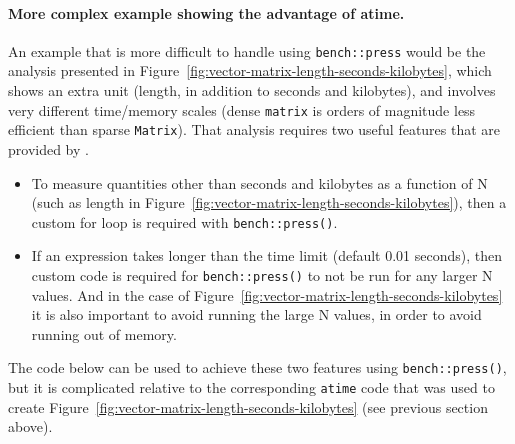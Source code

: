 \paragraph{More complex example showing the advantage of atime.}
An example that is more difficult to handle using \verb|bench::press| would be the analysis presented in Figure~\ref{fig:vector-matrix-length-seconds-kilobytes}, which shows an extra unit (length, in addition to seconds and kilobytes), and involves very different time/memory scales (dense \texttt{matrix} is orders of magnitude less efficient than sparse \texttt{Matrix}).
That analysis requires two useful features that are provided by . 
\begin{itemize}
\item To measure quantities other than seconds and kilobytes as a function of N (such as length in Figure~\ref{fig:vector-matrix-length-seconds-kilobytes}), then a custom for loop is required with \verb|bench::press()|.
\item If an expression takes longer than the time limit (default 0.01 seconds), then custom code is required for \verb|bench::press()| to not be run for any larger N values. 
And in the case of Figure~\ref{fig:vector-matrix-length-seconds-kilobytes} it is also important to avoid running the large N values, in order to avoid running out of memory.
\end{itemize}
The code below can be used to achieve these two features using \verb|bench::press()|, but it is complicated relative to the corresponding \verb|atime| code that was used to create Figure~\ref{fig:vector-matrix-length-seconds-kilobytes} (see previous section above).

